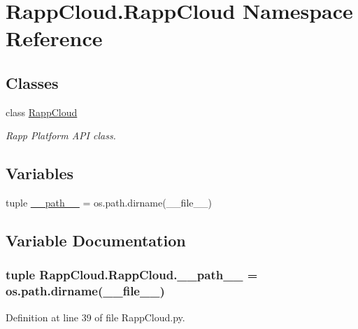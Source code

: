 \hypertarget{namespaceRappCloud_1_1RappCloud}{\section{Rapp\-Cloud.\-Rapp\-Cloud Namespace Reference}
\label{namespaceRappCloud_1_1RappCloud}
}
\subsection*{Classes}
\begin{DoxyCompactItemize}
\item 
class \hyperlink{classRappCloud_1_1RappCloud_1_1RappCloud}{Rapp\-Cloud}
\begin{DoxyCompactList}\small\item\em Rapp Platform A\-P\-I class. \end{DoxyCompactList}\end{DoxyCompactItemize}
\subsection*{Variables}
\begin{DoxyCompactItemize}
\item 
tuple \hyperlink{namespaceRappCloud_1_1RappCloud_ad92db320e20ad177b6a3d8a693c2f481}{\-\_\-\-\_\-path\-\_\-\-\_\-} = os.\-path.\-dirname(\-\_\-\-\_\-file\-\_\-\-\_\-)
\end{DoxyCompactItemize}


\subsection{Variable Documentation}
\hypertarget{namespaceRappCloud_1_1RappCloud_ad92db320e20ad177b6a3d8a693c2f481}{
\subsubsection[{\-\_\-\-\_\-path\-\_\-\-\_\-}]{\setlength{\rightskip}{0pt plus 5cm}tuple Rapp\-Cloud.\-Rapp\-Cloud.\-\_\-\-\_\-path\-\_\-\-\_\- = os.\-path.\-dirname(\-\_\-\-\_\-file\-\_\-\-\_\-)}}\label{namespaceRappCloud_1_1RappCloud_ad92db320e20ad177b6a3d8a693c2f481}


Definition at line 39 of file Rapp\-Cloud.\-py.

